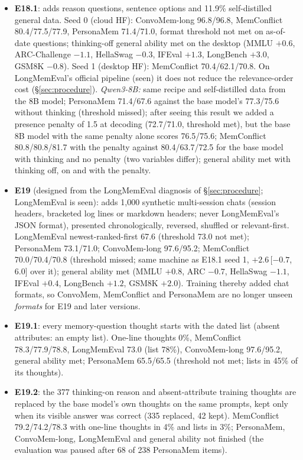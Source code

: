 \documentclass[11pt]{article}
\newcommand{\ci}[2]{\,[$#1$,\,$#2$]}
\begin{document}
\begin{itemize}
  \item \textbf{E18.1}: adds reason questions, sentence options and 11.9\% self-distilled general data. Seed 0 (cloud HF): ConvoMem-long 96.8/96.8, MemConflict 80.4/77.5/77.9, PersonaMem 71.4/71.0, format threshold not met on as-of-date questions; thinking-off general ability met on the desktop (MMLU $+0.6$, ARC-Challenge $-1.1$, HellaSwag $-0.3$, IFEval $+1.3$, LongBench $+3.0$, GSM8K $-0.8$). Seed 1 (desktop HF): MemConflict 70.4/62.1/70.8. On LongMemEval's official pipeline (seen) it does not reduce the relevance-order cost (\S\ref{sec:procedure}). \emph{Qwen3-8B:} same recipe and self-distilled data from the 8B model; PersonaMem 71.4/67.6 against the base model's 77.3/75.6 without thinking (threshold missed); after seeing this result we added a presence penalty of 1.5 at decoding (72.7/71.0, threshold met), but the base 8B model with the same penalty alone scores 76.5/75.6; MemConflict 80.8/80.8/81.7 with the penalty against 80.4/63.7/72.5 for the base model with thinking and no penalty (two variables differ); general ability met with thinking off, on and with the penalty.
  \item \textbf{E19} (designed from the LongMemEval diagnosis of \S\ref{sec:procedure}; LongMemEval is seen): adds 1{,}000 synthetic multi-session chats (session headers, bracketed log lines or markdown headers; never LongMemEval's JSON format), presented chronologically, reversed, shuffled or relevant-first. LongMemEval newest-ranked-first 67.6 (threshold 73.0 not met); PersonaMem 73.1/71.0; ConvoMem-long 97.6/95.2; MemConflict 70.0/70.4/70.8 (threshold missed; same machine as E18.1 seed 1, $+2.6$\ci{-0.7}{6.0} over it); general ability met (MMLU $+0.8$, ARC $-0.7$, HellaSwag $-1.1$, IFEval $+0.4$, LongBench $+1.2$, GSM8K $+2.0$). Training thereby added chat formats, so ConvoMem, MemConflict and PersonaMem are no longer unseen \emph{formats} for E19 and later versions.
  \item \textbf{E19.1}: every memory-question thought starts with the dated list (absent attributes: an empty list). One-line thoughts 0\%, MemConflict 78.3/77.9/78.8, LongMemEval 73.0 (list 78\%), ConvoMem-long 97.6/95.2, general ability met; PersonaMem 65.5/65.5 (threshold not met; lists in 45\% of its thoughts).
  \item \textbf{E19.2}: the 377 thinking-on reason and absent-attribute training thoughts are replaced by the base model's own thoughts on the same prompts, kept only when its visible answer was correct (335 replaced, 42 kept). MemConflict 79.2/74.2/78.3 with one-line thoughts in 4\% and lists in 3\%; PersonaMem, ConvoMem-long, LongMemEval and general ability not finished (the evaluation was paused after 68 of 238 PersonaMem items).
\end{itemize}
\end{document}
